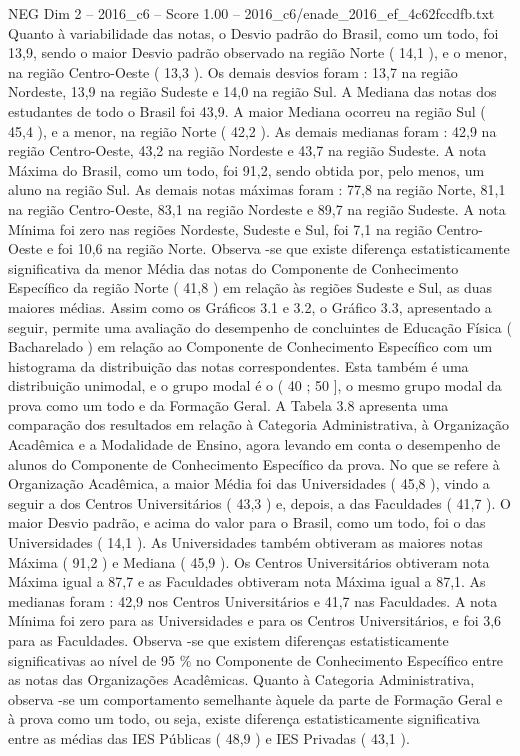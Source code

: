 \begin{textsample}{NEG Dim 2 – 2016\_c6 – Score 1.00 – 2016\_c6/enade\_2016\_ef\_4c62fccdfb.txt}
Quanto à variabilidade das notas, o Desvio padrão do Brasil, como um todo, foi 13,9, sendo o maior Desvio padrão observado na região Norte ( 14,1 ), e o menor, na região Centro-Oeste ( 13,3 ).
Os demais desvios foram : 13,7 na região Nordeste, 13,9 na região Sudeste e 14,0 na região Sul.
A Mediana das notas dos estudantes de todo o Brasil foi 43,9.
A maior Mediana ocorreu na região Sul ( 45,4 ), e a menor, na região Norte ( 42,2 ).
As demais medianas foram : 42,9 na região Centro-Oeste, 43,2 na região Nordeste e 43,7 na região Sudeste.
A nota Máxima do Brasil, como um todo, foi 91,2, sendo obtida por, pelo menos, um aluno na região Sul.
As demais notas máximas foram : 77,8 na região Norte, 81,1 na região Centro-Oeste, 83,1 na região Nordeste e 89,7 na região Sudeste.
A nota Mínima foi zero nas regiões Nordeste, Sudeste e Sul, foi 7,1 na região Centro-Oeste e foi 10,6 na região Norte.
Observa -se que existe diferença estatisticamente significativa da menor Média das notas do Componente de Conhecimento Específico da região Norte ( 41,8 ) em relação às regiões Sudeste e Sul, as duas maiores médias.
Assim como os Gráficos 3.1 e 3.2, o Gráfico 3.3, apresentado a seguir, permite uma avaliação do desempenho de concluintes de Educação Física ( Bacharelado ) em relação ao Componente de Conhecimento Específico com um histograma da distribuição das notas correspondentes.
Esta também é uma distribuição unimodal, e o grupo modal é o ( 40 ; 50 ], o mesmo grupo modal da prova como um todo e da Formação Geral.
A Tabela 3.8 apresenta uma comparação dos resultados em relação à Categoria Administrativa, à Organização Acadêmica e a Modalidade de Ensino, agora levando em conta o desempenho de alunos do Componente de Conhecimento Específico da prova.
No que se refere à Organização Acadêmica, a maior Média foi das Universidades ( 45,8 ), vindo a seguir a dos Centros Universitários ( 43,3 ) e, depois, a das Faculdades ( 41,7 ).
O maior Desvio padrão, e acima do valor para o Brasil, como um todo, foi o das Universidades ( 14,1 ).
As Universidades também obtiveram as maiores notas Máxima ( 91,2 ) e Mediana ( 45,9 ).
Os Centros Universitários obtiveram nota Máxima igual a 87,7 e as Faculdades obtiveram nota Máxima igual a 87,1.
As medianas foram : 42,9 nos Centros Universitários e 41,7 nas Faculdades.
A nota Mínima foi zero para as Universidades e para os Centros Universitários, e foi 3,6 para as Faculdades.
Observa -se que existem diferenças estatisticamente significativas ao nível de 95 \% no Componente de Conhecimento Específico entre as notas das Organizações Acadêmicas.
Quanto à Categoria Administrativa, observa -se um comportamento semelhante àquele da parte de Formação Geral e à prova como um todo, ou seja, existe diferença estatisticamente significativa entre as médias das IES Públicas ( 48,9 ) e IES Privadas ( 43,1 ).

\end{textsample}
